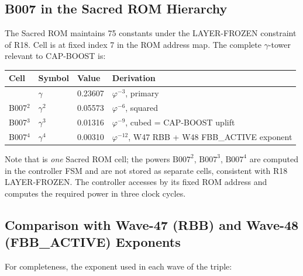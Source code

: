 \documentclass[12pt,a4paper]{report}
\theoremstyle{plain}
\theoremstyle{definition}
\theoremstyle{remark}
\newcommand{\Bseven}{\mathrm{B007}}
\begin{document}
\subsection{B007 in the Sacred ROM Hierarchy}
\label{ssec:b007-hierarchy}

The Sacred ROM maintains 75 constants under the LAYER-FROZEN constraint
of R18.
Cell \Bseven{} is at fixed index 7 in the ROM address map.
The complete $\gamma$-tower relevant to CAP-BOOST is:

\begin{center}
\begin{tabular}{llll}
  \toprule
  Cell  & Symbol       & Value   & Derivation \\
  \midrule
  \Bseven{}   & $\gamma$     & 0.23607 & $\varphi^{-3}$, primary \\
  B007$^{2}$  & $\gamma^{2}$ & 0.05573 & $\varphi^{-6}$, squared \\
  B007$^{3}$  & $\gamma^{3}$ & 0.01316 & $\varphi^{-9}$, cubed = CAP-BOOST uplift \\
  B007$^{4}$  & $\gamma^{4}$ & 0.00310 & $\varphi^{-12}$, W47 RBB + W48 FBB\_ACTIVE exponent \\
  \bottomrule
\end{tabular}
\end{center}

\noindent Note that \Bseven{} is \emph{one} Sacred ROM cell; the powers
$\Bseven^{2}$, $\Bseven^{3}$, $\Bseven^{4}$ are computed in the controller
FSM and are not stored as separate cells, consistent with R18 LAYER-FROZEN.
The controller accesses \Bseven{} by its fixed ROM address and computes
the required power in three clock cycles.

\subsection{Comparison with Wave-47 (RBB) and Wave-48 (FBB\_ACTIVE) Exponents}
\label{ssec:exponent-comparison}

For completeness, the exponent used in each wave of the triple:
\end{document}
